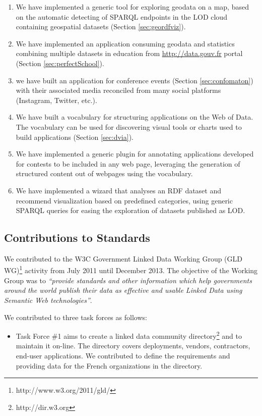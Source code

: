 \begin{enumerate}
\begin{enumerate}
\item We have implemented a generic tool for exploring geodata on a map, based on the automatic detecting of SPARQL endpoints in the LOD cloud containing geospatial datasets (Section \ref{sec:geordfviz}). 

\item We have implemented an application consuming geodata and statistics combining multiple datasets in education from \url{http://data.gouv.fr} portal (Section \ref{sec:perfectSchool}).

\item we have built an application for conference events (Section \ref{sec:confomaton}) with their associated media reconciled from many social platforms (Instagram, Twitter, etc.).

\item We have built a vocabulary for structuring applications on the Web of Data. The vocabulary can be used for discovering visual tools or charts used to build applications (Section \ref{sec:dvia}). 

\item We have implemented a generic plugin for annotating applications developed for contests to be included in any web page, leveraging  the generation of structured content out of webpages using the vocabulary. 


\item We have implemented a wizard that analyses an RDF dataset and recommend visualization based on predefined categories, using generic SPARQL queries for easing the exploration of datasets published as LOD. 


\end{enumerate}

\subsection{Contributions to Standards}
\label{sec:contrib-standard}
We contributed to the W3C Government Linked Data Working Group (GLD WG)\footnote{http://www.w3.org/2011/gld/} activity from July 2011 until December 2013.  The objective of the Working Group was to \textit{``provide standards and other information which help governments around the world publish their data as effective and usable Linked Data using Semantic Web technologies''}.

We contributed to three task forces as follows:
\begin{itemize}
\item Task Force \#1 aims to create a linked data community directory\footnote{http://dir.w3.org} and to maintain it on-line. The directory covers deployments, vendors, contractors, end-user applications. We contributed to define the requirements and providing data for the French organizations in the directory.


\end{itemize}
\end{enumerate}
